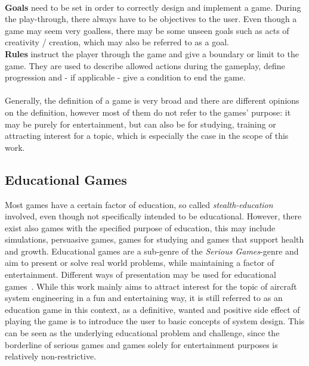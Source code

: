 \\
\textbf{Goals} need to be set in order to correctly design and implement a game.
During the play-through, there always have to be objectives to the user.
Even though a game may seem very goalless, there may be some unseen goals such as acts of creativity / creation, which may also be
referred to as a goal.
\\
\textbf{Rules} instruct the player through the game and give a boundary or limit to the game.
They are used to describe allowed actions during the gameplay, define progression and - if applicable - give a condition to
end the game.
\\ \\
Generally, the definition of a game is very broad and there are different opinions on the definition, however most of them
do not refer to the games' purpose: it may be purely for entertainment, but can also be for studying, training or attracting interest
for a topic, which is especially the case in the scope of this work.

\subsection{Educational Games}\label{subsec:educational-games}
Most games have a certain factor of education, so called \textit{stealth-education} involved, even though not
specifically intended to be educational.
However, there exist also games with the specified purpose of education, this may include simulations, persuasive games,
games for studying and games that support health and growth.
Educational games are a sub-genre of the \textit{Serious Games}-genre and aim to present or solve real world problems,
while maintaining a factor of entertainment.
Different ways of presentation may be used for educational games~\cite[p.43]{10.5555/2544002}.
While this work mainly aims to attract interest for the topic of aircraft system engineering in a fun and entertaining way, it is still
referred to as an education game in this context, as a definitive, wanted and positive side effect of playing the game is
to introduce the user to basic concepts of system design.
This can be seen as the underlying educational problem and challenge, since the borderline of serious games and games solely
for entertainment purposes is relatively non-restrictive.

